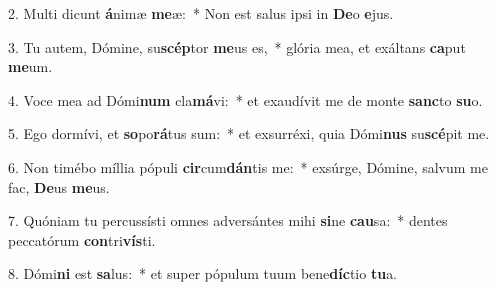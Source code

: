 2. Multi dicunt \textbf{á}nimæ \textbf{me}æ:~*  Non est salus ipsi in \textbf{De}o \textbf{e}jus.\

3. Tu autem, Dómine, su\textbf{scép}tor \textbf{me}us es,~*  glória mea, et exáltans \textbf{ca}put \textbf{me}um.\

4. Voce mea ad Dómi\textbf{num} cla\textbf{má}vi:~*  et exaudívit me de monte \textbf{sanc}to \textbf{su}o.\

5. Ego dormívi, et \textbf{so}po\textbf{rá}tus sum:~*  et exsurréxi, quia Dómi\textbf{nus} su\textbf{scé}pit me.\

6. Non timébo míllia pópuli \textbf{cir}cum\textbf{dán}tis me:~*  exsúrge, Dómine, salvum me fac, \textbf{De}us \textbf{me}us.\

7. Quóniam tu percussísti omnes adversántes mihi \textbf{si}ne \textbf{cau}sa:~*  dentes peccatórum \textbf{con}tri\textbf{vís}ti.\

8. Dómi\textbf{ni} est \textbf{sa}lus:~*  et super pópulum tuum bene\textbf{díc}tio \textbf{tu}a.\

